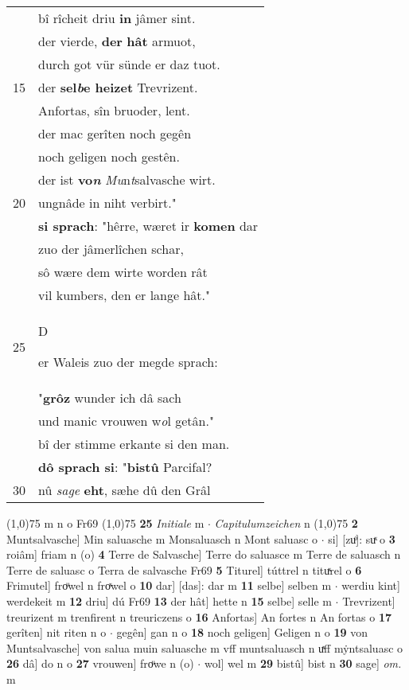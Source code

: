 \documentclass[8pt,a4paper,notitlepage]{article}
\begin{document}
\begin{table}[ht]
\begin{minipage}[t]{0.5\linewidth}
\begin{tabular}{rl}
 & bî rîcheit driu \textbf{in} jâmer sint.\\ 
 & der vierde, \textbf{der} \textbf{hât} armuot,\\ 
 & durch got vür sünde er daz tuot.\\ 
15 & der \textbf{sel\textit{b}e heizet} Trevrizent.\\ 
 & Anfortas, sîn bruoder, lent.\\ 
 & der mac gerîten noch gegên\\ 
 & noch geligen noch gestên.\\ 
 & der ist \textbf{vo\textit{n}} \textit{Mu}n\textit{t}salvasche wirt.\\ 
20 & ungnâde in niht verbirt."\\ 
 & \textbf{si sprach}: "hêrre, wæret ir \textbf{komen} dar\\ 
 & zuo der jâmerlîchen schar,\\ 
 & sô wære dem wirte worden rât\\ 
 & vil kumbers, den er lange hât."\\ 
25 & \begin{large}D\end{large}er Waleis zuo der megde sprach:\\ 
 & "\textbf{grôz} wunder ich dâ sach\\ 
 & und manic vrouwen w\textit{o}l getân."\\ 
 & bî der stimme erkante si den man.\\ 
 & \textbf{dô sprach si}: "\textbf{bistû} Parcifal?\\ 
30 & nû \textit{sage} \textbf{eht}, sæhe dû den Grâl\\ 
\end{tabular}
\scriptsize
\line(1,0){75} \newline
m n o Fr69 \newline
\line(1,0){75} \newline
\textbf{25} \textit{Initiale} m   $\cdot$ \textit{Capitulumzeichen} n  \newline
\line(1,0){75} \newline
\textbf{2} Muntsalvasche] Min saluasche m Monsaluasch n Mont saluasc o  $\cdot$ si] [zuͦ]: suͯ o \textbf{3} roiâm] friam n (o) \textbf{4} Terre de Salvasche] Terre do saluasce m Terre de saluasch n Terre de saluasc o Terra de salvasche Fr69 \textbf{5} Titurel] túttrel n tituͯrel o \textbf{6} Frimutel] froͧwel n froͯwel o \textbf{10} dar] [das]: dar m \textbf{11} selbe] selben m  $\cdot$ werdiu kint] werdekeit m \textbf{12} driu] dú Fr69 \textbf{13} der hât] hette n \textbf{15} selbe] selle m  $\cdot$ Trevrizent] treurizent m trenfirent n treuriczens o \textbf{16} Anfortas] An fortes n An fortas o \textbf{17} gerîten] nit riten n o  $\cdot$ gegên] gan n o \textbf{18} noch geligen] Geligen n o \textbf{19} von Muntsalvasche] von salua muin saluasche m vff muntsaluasch n uͯff mẏntsaluasc o \textbf{26} dâ] do n o \textbf{27} vrouwen] froͧwe n (o)  $\cdot$ wol] wel m \textbf{29} bistû] bist n \textbf{30} sage] \textit{om.} m \newline
\end{minipage}
\end{table}
\end{document}
